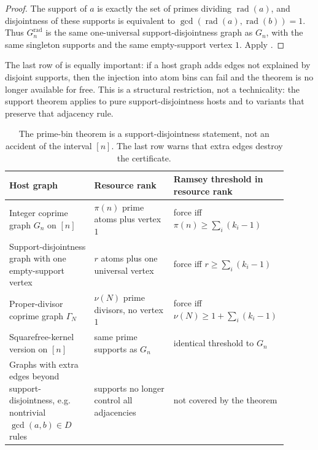 \documentclass[11pt]{article}
\theoremstyle{plain}
\theoremstyle{definition}
\theoremstyle{remark}
\begin{document}
\begin{proof}
The support of $a$ is exactly the set of primes dividing
$\operatorname{rad}(a)$, and disjointness of these supports is equivalent to
$\gcd(\operatorname{rad}(a),\operatorname{rad}(b))=1$.  Thus
$G_n^{\mathrm{rad}}$ is the same one-universal support-disjointness graph as
$G_n$, with the same singleton supports and the same empty-support vertex
$1$.  Apply .
\end{proof}

The last row of  is equally important: if a host
graph adds edges not explained by disjoint supports, then the injection into
atom bins can fail and the theorem is no longer available for free.  This is
a structural restriction, not a technicality: the support theorem applies to
pure support-disjointness hosts and to variants that preserve that adjacency
rule.

\begin{table}[htbp]
\centering
\caption{The prime-bin theorem is a support-disjointness statement, not an
accident of the interval $[n]$.  The last row warns that extra edges destroy
the certificate.}
\label{tab:support-examples}
\small
\begin{tabular}{@{}>{\raggedright\arraybackslash}p{0.30\linewidth}>{\raggedright\arraybackslash}p{0.28\linewidth}>{\raggedright\arraybackslash}p{0.32\linewidth}@{}}
\toprule
Host graph & Resource rank & Ramsey threshold in resource rank \\
\midrule
Integer coprime graph $G_n$ on $[n]$ & $\pi(n)$ prime atoms plus vertex $1$ & force iff $\pi(n)\ge \sum_i(k_i-1)$ \\
Support-disjointness graph with one empty-support vertex & $r$ atoms plus one universal vertex & force iff $r\ge \sum_i(k_i-1)$ \\
Proper-divisor coprime graph $\Gamma_N$ & $\nu(N)$ prime divisors, no vertex $1$ & force iff $\nu(N)\ge 1+\sum_i(k_i-1)$ \\
Squarefree-kernel version on $[n]$ & same prime supports as $G_n$ & identical threshold to $G_n$ \\
Graphs with extra edges beyond support-disjointness, e.g. nontrivial $\gcd(a,b)\in D$ rules & supports no longer control all adjacencies & not covered by the theorem \\
\bottomrule
\end{tabular}

\end{table}
\end{document}
